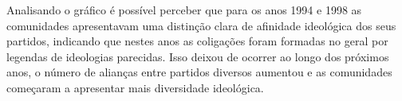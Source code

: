 Analisando o gráfico é possível perceber que para os anos 1994 e 1998 as comunidades apresentavam uma distinção clara de afinidade ideológica dos seus partidos, indicando que nestes anos as coligações foram formadas no geral por legendas de ideologias parecidas. Isso deixou de ocorrer ao longo dos próximos anos, o número de alianças entre partidos diversos aumentou e as comunidades começaram a apresentar mais diversidade ideológica.

